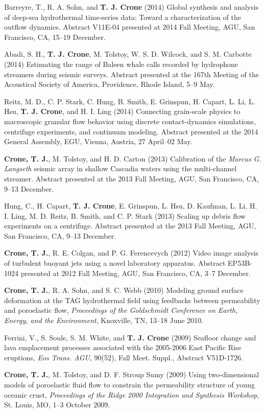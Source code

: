 \documentclass[11pt]{res}
\begin{document}
\begin{resume}
Barreyre, T., R. A. Sohn, and {\bf T. J. Crone} (2014) Global synthesis and analysis of deep-sea hydrothermal time-series data: Toward a characterization of the outflow dynamics. Abstract V11E-04 presented at 2014 Fall Meeting, AGU, San Francisco, CA, 15--19 December.

Abadi, S. H., {\bf T. J. Crone}, M. Tolstoy, W. S. D. Wilcock, and S. M. Carbotte (2014) Estimating the range of Baleen whale calls recorded by hydrophone streamers during seismic surveys. Abstract presented at the 167th Meeting of the Acoustical Society of America, Providence, Rhode Island, 5--9 May.

Reitz, M. D., C. P. Stark, C. Hung, B. Smith, E. Grinspun, H. Capart, L. Li, L. Hsu, {\bf T. J. Crone}, and H. I. Ling (2014) Connecting grain-scale physics to macroscopic granular flow behavior using discrete contact-dynamics simulations, centrifuge experiments, and continuum modeling. Abstract presented at the 2014 General Assembly, EGU, Vienna, Austria, 27 April--02 May.

{\bf Crone, T. J.}, M. Tolstoy, and H. D. Carton (2013) Calibration of the {\em Marcus G. Langseth} seismic array in shallow Cascadia waters using the multi-channel streamer. Abstract presented at the 2013 Fall Meeting, AGU, San Francisco, CA, 9--13 December.

Hung, C., H. Capart, {\bf T. J. Crone}, E. Grinspun, L. Hsu, D. Kaufman, L. Li, H. I. Ling, M. D. Reitz, B. Smith, and C. P. Stark (2013) Scaling up debris flow experiments on a centrifuge. Abstract presented at the 2013 Fall Meeting, AGU, San Francisco, CA, 9--13 December.

{\bf Crone, T. J.}, R. E. Colgan, and P. G. Ferencevych (2012) Video image analysis of turbulent buoyant jets using a novel laboratory apparatus. Abstract EP53B-1024 presented at 2012 Fall Meeting, AGU, San Francisco, CA, 3--7 December.

{\bf Crone, T. J.}, R. A. Sohn, and S. C. Webb (2010) Modeling ground surface deformation at the TAG hydrothermal field using feedbacks between permeability and poroelastic flow, {\em Proceedings of the Goldschmidt Conference on Earth, Energy, and the Environment}, Knoxville, TN, 13--18 June 2010.

Ferrini, V., S. Soule, S. M. White, and {\bf T. J. Crone} (2009) Seafloor change and lava emplacement processes associated with the 2005-2006 East Pacific Rise eruptions, {\em Eos Trans. AGU}, 90(52), Fall Meet. Suppl., Abstract V51D-1726.

{\bf Crone, T. J.}, M. Tolstoy, and D. F. Stroup Sumy (2009) Using two-dimensional models of poroelastic fluid flow to constrain the permeability structure of young oceanic crust, {\em Proceedings of the Ridge 2000 Integration and Synthesis Workshop}, St. Louis, MO, 1--3 October 2009.


\end{resume}
\end{document}
